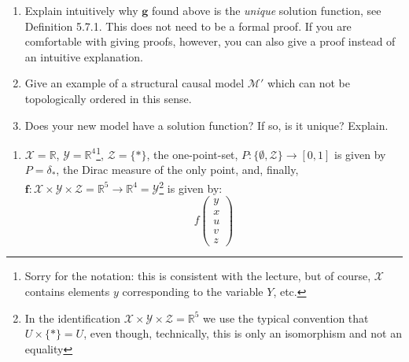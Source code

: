 \begin{enumerate}
\begin{enumerate}
		Finally, formally verify that it is a solution function by showing that the structural equation $\boldsymbol{g}(\boldsymbol{x}, \boldsymbol{z}) = \boldsymbol{f}(\boldsymbol{x}, \boldsymbol{g}(\boldsymbol{x}, \boldsymbol{z}), \boldsymbol{z})$ is satisfied for all $\boldsymbol{x} \in \boldsymbol{\mathcal{X}}$ and almost all $\boldsymbol{z} \in \boldsymbol{\mathcal{Z}}$.
		\item Explain intuitively why $\boldsymbol{g}$ found above is the \emph{unique} solution function, see Definition 5.7.1. This does not need to be a formal proof.
		If you are comfortable with giving proofs, however, you can also give a proof instead of an intuitive explanation.
		\item Give an example of a structural causal model $\mathcal{M}'$ which can not be topologically ordered in this sense.
		\item Does your new model have a solution function? If so, is it unique? Explain.
	\end{enumerate}
	\begin{gradedsolution}
		\begin{enumerate}
			\item $\boldsymbol{\mathcal{X}} = \mathbb{R}$, $\boldsymbol{\mathcal{Y}} = \mathbb{R}^{4}$\footnote{Sorry for the notation: this is consistent with the lecture, but of course, $\mathbf{\mathcal{X}}$ contains elements $y$ corresponding to the variable $Y$, etc.}, $\boldsymbol{\mathcal{Z}} = \{*\}$, the one-point-set, $P: \{\emptyset, \boldsymbol{\mathcal{Z}}\} \to [0,1]$ is given by $P = \delta_{*}$, the Dirac measure of the only point, and, finally, $\boldsymbol{f}: \boldsymbol{\mathcal{X}} \times \boldsymbol{\mathcal{Y}} \times \boldsymbol{\mathcal{Z}} = \mathbb{R}^{5} \to \mathbb{R}^{4} = \boldsymbol{\mathcal{Y}}$\footnote{In the identification $\boldsymbol{\mathcal{X}} \times \boldsymbol{\mathcal{Y}} \times \boldsymbol{\mathcal{Z}} = \mathbb{R}^{5}$ we use the typical convention that $U \times \{*\} = U$, even though, technically, this is only an isomorphism and not an equality} is given by:
			\begin{equation}
				f \begin{pmatrix} y \\ x \\ u \\ v \\ z\end{pmatrix}

\end{equation}
\end{enumerate}
\end{gradedsolution}
\end{enumerate}
